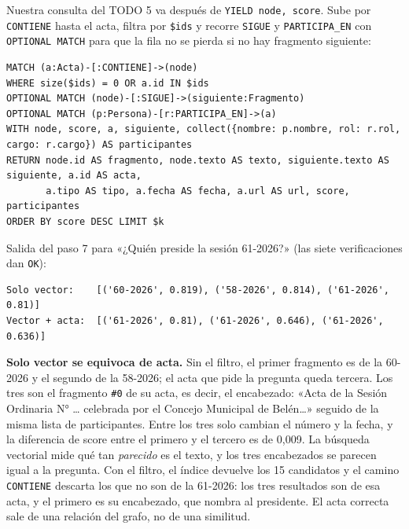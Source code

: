 \documentclass[10pt,letterpaper]{article}
\begin{document}
Nuestra consulta del TODO 5 va después de \texttt{YIELD node, score}. Sube por \texttt{CONTIENE} hasta el
acta, filtra por \texttt{\$ids} y recorre \texttt{SIGUE} y \texttt{PARTICIPA\_EN} con \texttt{OPTIONAL MATCH}
para que la fila no se pierda si no hay fragmento siguiente:
\begin{Verbatim}
MATCH (a:Acta)-[:CONTIENE]->(node)
WHERE size($ids) = 0 OR a.id IN $ids
OPTIONAL MATCH (node)-[:SIGUE]->(siguiente:Fragmento)
OPTIONAL MATCH (p:Persona)-[r:PARTICIPA_EN]->(a)
WITH node, score, a, siguiente, collect({nombre: p.nombre, rol: r.rol, cargo: r.cargo}) AS participantes
RETURN node.id AS fragmento, node.texto AS texto, siguiente.texto AS siguiente, a.id AS acta,
       a.tipo AS tipo, a.fecha AS fecha, a.url AS url, score, participantes
ORDER BY score DESC LIMIT $k
\end{Verbatim}
Salida del paso 7 para «¿Quién preside la sesión 61-2026?» (las siete verificaciones dan \texttt{OK}):
\begin{Verbatim}
Solo vector:    [('60-2026', 0.819), ('58-2026', 0.814), ('61-2026', 0.81)]
Vector + acta:  [('61-2026', 0.81), ('61-2026', 0.646), ('61-2026', 0.636)]
\end{Verbatim}

\textbf{Solo vector se equivoca de acta.} Sin el filtro, el primer fragmento es de la 60-2026 y el
segundo de la 58-2026; el acta que pide la pregunta queda tercera. Los tres son el fragmento \texttt{\#0}
de su acta, es decir, el encabezado: «Acta de la Sesión Ordinaria N° \ldots{} celebrada por el Concejo
Municipal de Belén\ldots» seguido de la misma lista de participantes. Entre los tres solo cambian el
número y la fecha, y la diferencia de score entre el primero y el tercero es de 0,009. La búsqueda
vectorial mide qué tan \emph{parecido} es el texto, y los tres encabezados se parecen igual a la
pregunta. Con el filtro, el índice devuelve los 15 candidatos y el camino \texttt{CONTIENE} descarta los
que no son de la 61-2026: los tres resultados son de esa acta, y el primero es su encabezado, que nombra
al presidente. El acta correcta sale de una relación del grafo, no de una similitud.
\end{document}
